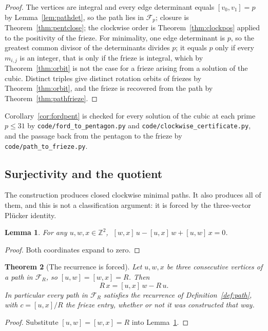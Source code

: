 \documentclass[11pt]{article}
\theoremstyle{plain}
\newtheorem{theorem}{Theorem}[section]
\newtheorem{lemma}[theorem]{Lemma}
\theoremstyle{definition}
\newcommand{\Z}{\mathbb{Z}}
\begin{document}
\begin{proof}
The vertices are integral and every edge determinant equals $[v_0,v_1]=p$ by
Lemma~\ref{lem:pathdet}, so the path lies in $\mathcal F_p$; closure is
Theorem~\ref{thm:pentclose}; the clockwise order is Theorem~\ref{thm:clockpos} applied to
the positivity of the frieze. For minimality, one edge determinant is $p$, so the greatest
common divisor of the determinants divides $p$; it equals $p$ only if every $m_{i,j}$ is an
integer, that is only if the frieze is integral, which by Theorem~\ref{thm:orbit} is not the
case for a frieze arising from a solution of the cubic. Distinct triples give distinct
rotation orbits of friezes by Theorem~\ref{thm:orbit}, and the frieze is recovered from the
path by Theorem~\ref{thm:pathfrieze}.
\end{proof}

Corollary~\ref{cor:fordpent} is checked for every solution of the cubic at each prime
$p\le31$ by \texttt{code/ford\_to\_pentagon.py} and \texttt{code/clockwise\_certificate.py},
and the passage back from the pentagon to the frieze by \texttt{code/path\_to\_frieze.py}.

\subsection{Surjectivity and the quotient}

The construction produces closed clockwise minimal paths. It also produces all of them, and
this is not a classification argument: it is forced by the three-vector Pl\"ucker identity.

\begin{lemma}\label{lem:plucker3}
For any $u,w,x\in\Z^2$, $\;[w,x]\,u-[u,x]\,w+[u,w]\,x=0$.
\end{lemma}

\begin{proof}
Both coordinates expand to zero.
\end{proof}

\begin{theorem}[The recurrence is forced]\label{thm:forced}
Let $u,w,x$ be three consecutive vertices of a path in $\mathcal F_R$, so $[u,w]=[w,x]=R$.
Then
\[
  R\,x=[u,x]\,w-R\,u .
\]
In particular every path in $\mathcal F_R$ satisfies the recurrence of
Definition~\ref{def:path}, with $c=[u,x]/R$ the frieze entry, whether or not it was
constructed that way.
\end{theorem}

\begin{proof}
Substitute $[u,w]=[w,x]=R$ into Lemma~\ref{lem:plucker3}.
\end{proof}
\end{document}
